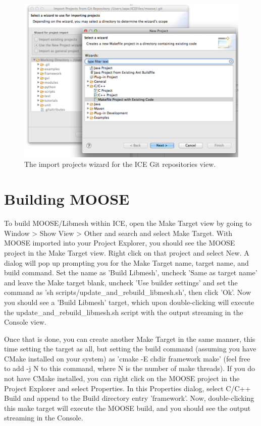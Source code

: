 \begin{figure}[htbp]
\centering
\includegraphics[width=\textwidth]{figures/Import_git_proj.png}
\caption{The import projects wizard for the ICE Git repositories view. }
\end{figure}

\section{Building MOOSE}\label{building-moose}

To build MOOSE/Libmesh within ICE, open the Make Target view by going to
Window \textgreater{} Show View \textgreater{} Other and search and
select Make Target. With MOOSE imported into your Project Explorer, you
should see the MOOSE project in the Make Target view. Right click on
that project and select New. A dialog will pop up prompting you for the
Make Target name, target name, and build command. Set the name as 'Build
Libmesh', uncheck 'Same as target name' and leave the Make target blank,
uncheck 'Use builder settings' and set the command as 'sh
scripts/update\_and\_rebuild\_libmesh.sh', then click 'Ok'. Now you
should see a 'Build Libmesh' target, which upon double-clicking will
execute the update\_and\_rebuild\_libmesh.sh script with the output
streaming in the Console view.

Once that is done, you can create another Make Target in the same
manner, this time setting the target as all, but setting the build
command (assuming you have CMake installed on your system) as 'cmake -E
chdir framework make' (feel free to add -j N to this command, where N is
the number of make threads). If you do not have CMake installed, you can
right click on the MOOSE project in the Project Explorer and select
Properties. In this Properties dialog, select C/C++ Build and append to
the Build directory entry 'framework'. Now, double-clicking this make
target will execute the MOOSE build, and you should see the output
streaming in the Console.

